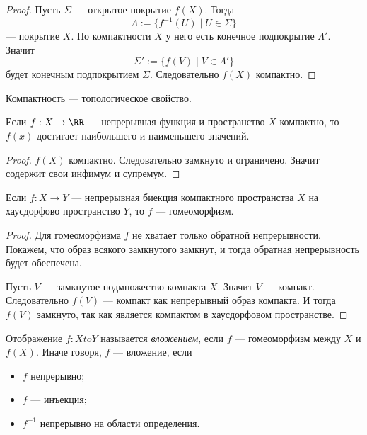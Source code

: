 \documentclass[12pt,a4paper]{article}
\begin{document}
    \begin{proof}
        Пусть $\Sigma$ --- открытое покрытие $f(X)$. Тогда
        \[\Lambda := \{f^{-1}(U) \mid U \in \Sigma\}\]
        --- покрытие $X$. По компактности $X$ у него есть конечное подпокрытие $\Lambda'$. Значит
        \[\Sigma' := \{f(V) \mid V \in \Lambda'\}\]
        будет конечным подпокрытием $\Sigma$. Следовательно $f(X)$ компактно.
    \end{proof}

    \begin{corollary}
        Компактность --- топологическое свойство.
    \end{corollary}

    \begin{theorem}[Вейерштрассса]
        Если $f: X \to \RR$ --- непрерывная функция и пространство $X$ компактно, то $f(x)$ достигает наибольшего и наименьшего значений.
    \end{theorem}

    \begin{proof}
        $f(X)$ компактно. Следовательно замкнуто и ограничено. Значит содержит свои инфимум и супремум.
    \end{proof}

    \begin{theorem}
        Если $f: X \to Y$ --- непрерывная биекция компактного пространства $X$ на хаусдорфово пространство $Y$, то $f$ --- гомеоморфизм.
    \end{theorem}

    \begin{proof}
        Для гомеоморфизма $f$ не хватает только обратной непрерывности. Покажем, что образ всякого замкнутого замкнут, и тогда обратная непрерывность будет обеспечена.

        Пусть $V$ --- замкнутое подмножество компакта $X$. Значит $V$ --- компакт. Следовательно $f(V)$ --- компакт как непрерывный образ компакта. И тогда $f(V)$ замкнуто, так как является компактом в хаусдорфовом пространстве.
    \end{proof}

    \begin{definition}
        Отображение $f: X to Y$ называется \emph{вложением}, если $f$ --- гомеоморфизм между $X$ и $f(X)$. Иначе говоря, $f$ --- вложение, если
        \begin{itemize}
            \item $f$ непрерывно;
            \item $f$ --- инъекция;
            \item $f^{-1}$ непрерывно на области определения.
        \end{itemize}
    \end{definition}
\end{document}
